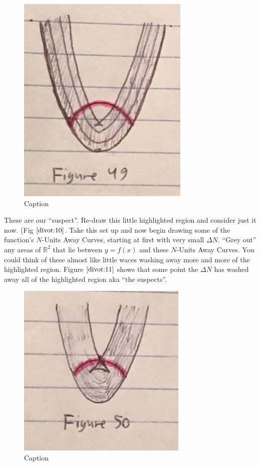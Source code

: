 \begin{figure}
  \label{divot:10}
  \includegraphics[width=\fw]{img/12-divot/10.png}
  \caption{Caption}
\end{figure}

These are our ``suspect''. Re-draw this little highlighted region and consider just it now. (Fig $\ref{divot:10}$. Take this set up and now begin drawing some of the function's $N$-Units Away Curves, starting at first with very small $ \Delta N$. ``Grey out'' any areas of $\mathbb{R}^2$ that lie between $y = f(x)$ and these $N$-Units Away Curves. You could think of these almost like little waces washing away more and more of the highlighted region. Figure $\ref{divot:11}$ shows that some point the $\Delta N$ has washed away all of the highlighted region aka ``the suspects''.

\renewcommand\w{0.25\textwidth}
\renewcommand\fw{0.9\linewidth}

\begin{figure}
  \label{divot:11}
  \includegraphics[width=\fw]{img/12-divot/11.png}
  \caption{Caption}
\end{figure}

